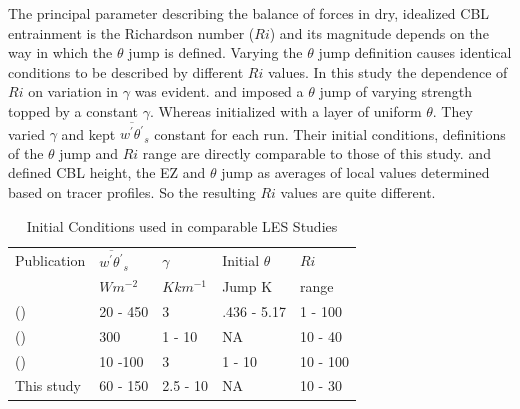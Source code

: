 The principal parameter describing the balance of forces in dry, idealized CBL entrainment is the Richardson number ($Ri$) and its magnitude depends on the way in which the $\theta$ jump is defined.  Varying the $\theta$ jump definition causes identical conditions to be described by different $Ri$ values.  In this study the dependence of $Ri$ on variation in $\gamma$ was evident.  \cite{BrooksFowler2} and \cite{SullMoengStev} imposed a $\theta$ jump of varying strength topped by a constant $\gamma$.  Whereas \cite{FedConzMir04} initialized with a layer of uniform $\theta$.  They varied $\gamma$ and kept $\overline{w^{'}\theta^{'}}_{s}$ constant for each run.  Their initial conditions, definitions of the $\theta$ jump and $Ri$ range are directly comparable to those of this study.  \cite{BrooksFowler2} and \cite{SullMoengStev} defined CBL height, the EZ and $\theta$ jump as averages of local values determined based on tracer profiles.  So the resulting $Ri$ values are quite different.    

\begin{table}[htbp]
\caption[Initial Conditions used in comparable LES Studies]{Initial Conditions used in comparable LES Studies}

  
    \begin{tabular}{ p{4cm} p{1.4cm} p{1.4cm} p{1.7cm} p{1.8cm}}
    
Publication & $\overline{w^{'}\theta^{'}}_{s}$& $\gamma$& Initial $\theta$ & $Ri$ \\ 
& $Wm^{-2}$ & $Kkm^{-1}$ & Jump K & range \\ \hline
      \citeauthor{SullMoengStev} (\citeyear{SullMoengStev}) & 20 - 450& 3  &.436 - 5.17 & 1 - 100\\
      \citeauthor{FedConzMir04} (\citeyear{FedConzMir04}) & 300 & 1 - 10 & NA & 10 - 40\\ 
      \citeauthor{BrooksFowler2} (\citeyear{BrooksFowler2}) &  10 -100 &  3& 1 - 10 &10 - 100 \\
      This study & 60 - 150 & 2.5 - 10& NA & 10 - 30\\ \hline 
      
    \end{tabular}
\label{table:initconditcomp}   

\end{table}


